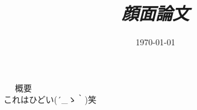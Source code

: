 \documentclass[12pt]{jsarticle}
\title{\HUGE \it{顔面論文}}
\date{\today}
\begin{document}
\maketitle

\newpage
　
\newpage
{\huge 概要}\\
これはひどい\sf (´\_ゝ｀)笑

\newpage
\tableofcontents

\newpage


\newpage

\newpage

\newpage

\newpage

\newpage

\newpage

\newpage

\newpage

\end{document}

